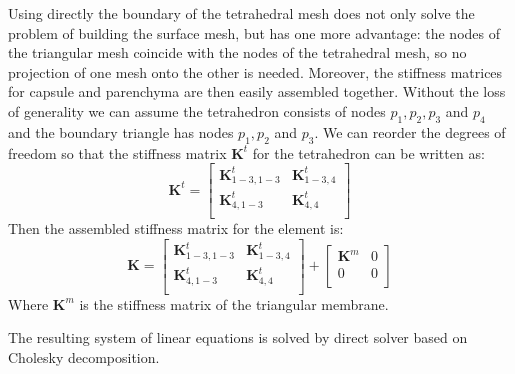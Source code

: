 \documentclass{acm_proc_article-sp}
\newcommand{\CD}[1]{{\color{green}\textbf{CD: #1}}}
\newcommand{\Mat}[1]{\mathbf{#1}}
\begin{document}
Using directly the boundary of the tetrahedral mesh does not only solve the
problem of building the surface mesh, but has one more advantage: the nodes
of the triangular mesh coincide with the nodes of the tetrahedral mesh, so no projection of one mesh onto the other is needed.
Moreover, the stiffness matrices for capsule and parenchyma are then easily assembled together.
%
Without the loss of generality we can assume the tetrahedron consists of
nodes $p_1, p_2, p_3$ and $p_4$ and the boundary triangle has nodes $p_1, p_2$
and $p_3$. We can reorder the degrees of freedom so that the stiffness
matrix $\Mat{K}^t$ for the tetrahedron can be written as:
%
\begin{equation}
  \Mat{K}^t = \left[\begin{array}{c|c}
      \Mat{K}^t_{1-3,1-3} & \Mat{K}^t_{1-3,4} \\
      \hline
      \Mat{K}^t_{4,1-3} & \Mat{K}^t_{4,4} \\
  \end{array}\right]
\end{equation}
%
Then the assembled stiffness matrix for the element is:
%
\begin{equation}
  \Mat{K} = \left[\begin{array}{c|c}
      \Mat{K}^t_{1-3,1-3} & \Mat{K}^t_{1-3,4} \\
      \hline
      \Mat{K}^t_{4,1-3} & \Mat{K}^t_{4,4} \\
  \end{array}\right]
  +
  \left[\begin{array}{c|c}
      \Mat{K}^m & 0 \\
      \hline
      0 & 0 \\
  \end{array}\right]
\end{equation}
%
Where $\Mat{K}^m$ is the stiffness matrix of the triangular membrane.

The resulting system of linear equations is solved by direct solver based on Cholesky decomposition.



\end{document}

